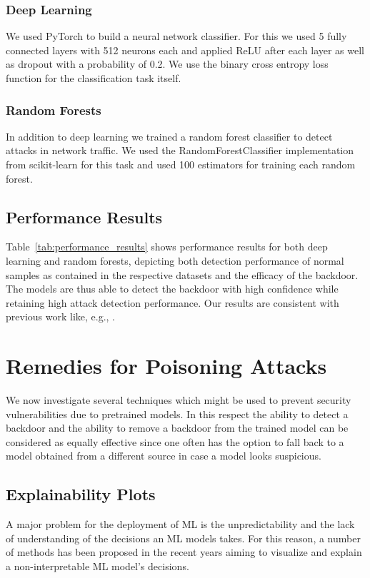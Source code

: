 \documentclass[10pt,sigconf,letterpaper,dvipsnames]{acmart}
\begin{document}
\subsubsection{Deep Learning}
We used PyTorch to build a neural network classifier. For this we used 5 fully connected layers with 512 neurons each and applied ReLU after each layer as well as dropout with a probability of 0.2. We use the binary cross entropy loss function for the classification task itself.

\subsubsection{Random Forests}
In addition to deep learning we trained a random forest classifier to detect attacks in network traffic. We used the RandomForestClassifier implementation from scikit-learn for this task and used 100 estimators for training each random forest.


\subsection{Performance Results}
Table~\ref{tab:performance_results} shows performance results for both deep learning and random forests, depicting both detection performance of normal samples as contained in the respective datasets and the efficacy of the backdoor. The models are thus able to detect the backdoor with high confidence while retaining high attack detection performance.
Our results are consistent with previous work like, e.g., \cite{meghdouri_analysis_2018}.

\section{Remedies for Poisoning Attacks}
We now investigate several techniques which might be used to prevent security vulnerabilities due to pretrained models. In this respect the ability to detect a backdoor and the ability to remove a backdoor from the trained model can be considered as equally effective since one often has the option to fall back to a model obtained from a different source in case a model looks suspicious.

\subsection{Explainability Plots} \label{sec:plots}
A major problem for the deployment of ML is the unpredictability and the lack of understanding of the decisions an ML models takes. For this reason, a number of methods has been proposed in the recent years aiming to visualize and explain a non-interpretable ML model's decisions.
\end{document}
